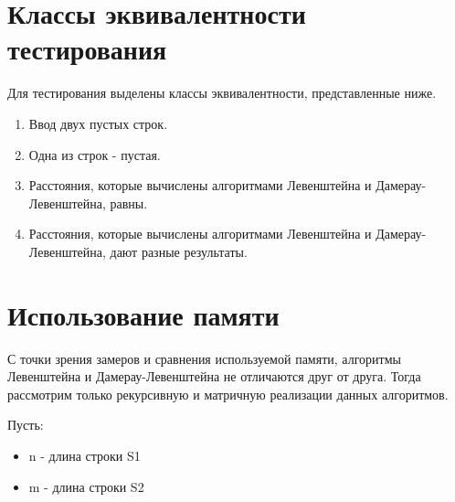 \clearpage

\section{Классы эквивалентности тестирования}

Для тестирования выделены классы эквивалентности, представленные ниже.

\begin{enumerate}
    \item Ввод двух пустых строк.
    \item Одна из строк - пустая.
    \item Расстояния, которые вычислены алгоритмами Левенштейна и Дамерау-Левенштейна, равны.
    \item Расстояния, которые вычислены алгоритмами Левенштейна и Дамерау-Левенштейна, дают разные результаты.
\end{enumerate}

\section{Использование памяти}

С точки зрения замеров и сравнения используемой памяти, алгоритмы Левенштейна и Дамерау-Левенштейна не отличаются друг от друга.
Тогда рассмотрим только рекурсивную и матричную реализации данных алгоритмов.

Пусть:
\begin{itemize}
    \item n - длина строки S1
    \item m - длина строки S2
\end{itemize}

